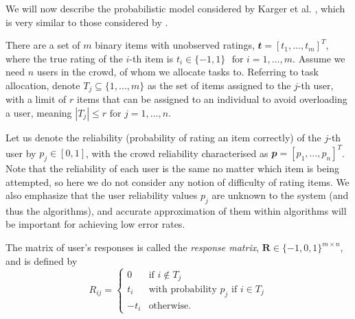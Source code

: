 \documentclass[12pt]{article}
\numberwithin{equation}{section}
\newcommand*\vecvar[1]{\mathbfit#1}
\newcommand*\matvar[1]{\mathbf#1}
\newcommand*\abs[1]{\left\vert#1\right\vert}
\begin{document}
We will now describe the probabilistic model considered by Karger et al. \cite{KOS13}, which is very similar to those considered by \cite{GKM11,DDK+13}.

There are a set of $m$ binary items with unobserved ratings, $\vecvar{t} = [t_{1},\dots,t_{m}]^{T}$, where the true rating of the $i$-th item is $t_{i} \in \{-1,1\}$ $\text{ for } i=1,\dots,m$. Assume we need $n$ users in the crowd, of whom we allocate tasks to. Referring to task allocation, denote $T_{j} \subseteq \{1,\dots,m\}$ as the set of items assigned to the $j$-th user, with a limit of $r$ items that can be assigned to an individual to avoid overloading a user, meaning $\abs{T_{j}} \le r \text{ for } j=1,\dots,n$.

Let us denote the reliability (probability of rating an item correctly) of the $j$-th user by $p_{j} \in [0,1]$, with the crowd reliability characterised as $\vecvar{p} = [p_{1},\dots,p_{n}]^{T}$. Note that the reliability of each user is the same no matter which item is being attempted, so here we do not consider any notion of difficulty of rating items. We also emphasize that the user reliability values $p_{j}$ are unknown to the system (and thus the algorithms), and accurate approximation of them within algorithms will be important for achieving low error rates.

The matrix of user's responses is called the \textit{response matrix}, $\matvar{R} \in \{-1,0,1\}^{m \times n}$, and is defined by
\begin{equation}
	R_{ij} =
	\begin{cases}
		0 & \text{if } i \not \in T_{j}\\
		t_{i} & \text{with probability }  p_{j} \text{ if } i \in T_{j}\\
		-t_{i} & \text{otherwise}.
	\end{cases}
\end{equation}
\end{document}
